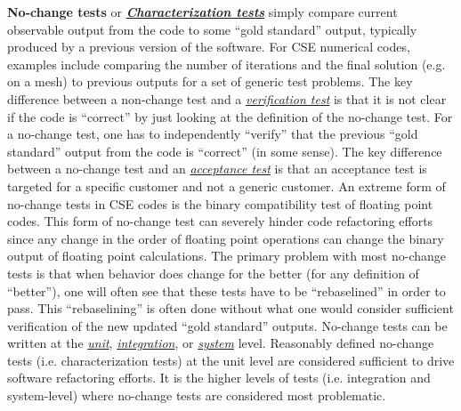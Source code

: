 \documentclass[]{article}
\begin{document}
\protect\hypertarget{id.h6jkn7ujujea}{}{}\textbf{No-change tests} or
\href{http://en.wikipedia.org/wiki/Characterization_test}{\textbf{\emph{Characterization
tests}}} simply compare current observable output from the code to some
``gold standard'' output, typically produced by a previous version of
the software. For CSE numerical codes, examples include comparing the
number of iterations and the final solution (e.g. on a mesh) to previous
outputs for a set of generic test problems. The key difference between a
non-change test and a
\protect\hyperlink{id.ew32p2pvdumb}{\emph{verification test}} is that it
is not clear if the code is ``correct'' by just looking at the
definition of the no-change test. For a no-change test, one has to
independently ``verify'' that the previous ``gold standard'' output from
the code is ``correct'' (in some sense). The key difference between a
no-change test and an
\protect\hyperlink{id.vshb6z6grels}{\emph{acceptance test}} is that an
acceptance test is targeted for a specific customer and not a generic
customer. An extreme form of no-change tests in CSE codes is the binary
compatibility test of floating point codes. This form of no-change test
can severely hinder code refactoring efforts since any change in the
order of floating point operations can change the binary output of
floating point calculations. The primary problem with most no-change
tests is that when behavior does change for the better (for any
definition of ``better''), one will often see that these tests have to
be ``rebaselined'' in order to pass. This ``rebaselining'' is often done
without what one would consider sufficient verification of the new
updated ``gold standard'' outputs. No-change tests can be written at the
\protect\hyperlink{id.5saje75168fl}{\emph{unit}},
\protect\hyperlink{id.j931ebv6xsmb}{\emph{integration}}, or
\protect\hyperlink{id.vllu2z1lvhtb}{\emph{system}} level. Reasonably
defined no-change tests (i.e. characterization tests) at the unit level
are considered sufficient to drive software refactoring efforts. It is
the higher levels of tests (i.e. integration and system-level) where
no-change tests are considered most problematic.
\end{document}
